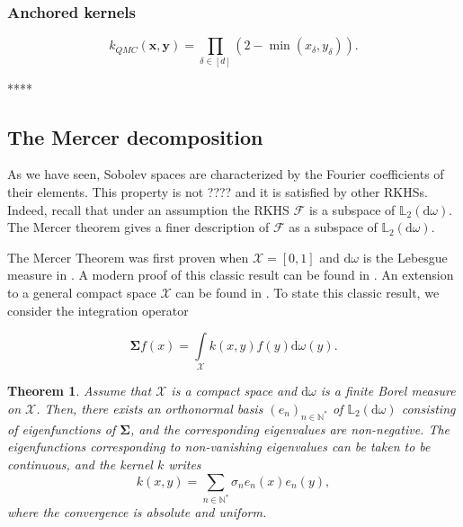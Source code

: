 \documentclass[twoside,11pt]{book}
\newtheorem{theorem}{Theorem}
\numberwithin{theorem}{chapter}
\numberwithin{definition}{chapter}
\numberwithin{proposition}{chapter}
\numberwithin{corollary}{chapter}
\numberwithin{example}{chapter}
\numberwithin{lemma}{chapter}
\begin{document}
\subsubsection{Anchored kernels}

\begin{equation}
k_{QMC}(\bm{x},\bm{y}) = \prod\limits_{\delta \in [d]} (2-\min(x_{\delta},y_{\delta})).
\end{equation}

****


\subsection{The Mercer decomposition}
\label{subsec:mercer}
As we have seen, Sobolev spaces are characterized by the Fourier coefficients of their elements. This property is not ???? and it is satisfied by other RKHSs. Indeed, recall that under an assumption the RKHS $\mathcal{F}$ is a subspace of $\mathbb{L}_{2}(\mathrm{d}\omega)$. The Mercer theorem gives a finer description of $\mathcal{F}$ as a subspace of $\mathbb{L}_{2}(\mathrm{d}\omega)$.



The Mercer Theorem was first proven when $\mathcal{X} = [0,1]$ and $\mathrm{d}\omega$ is the Lebesgue measure in \cite{Mer1909}.
A modern proof of this classic result can be found in \cite{Lax02}. An extension to a general compact space $\mathcal{X}$ can be  found in \cite{CuZh07}. To state this classic result, we consider the integration operator

\begin{equation}
\bm{\Sigma} f(x) = \int\limits_{\mathcal{X}} k(x,y)f(y) \mathrm{d}\omega(y).
\end{equation}
\begin{theorem}\label{thm:Mercer_for_compact}
Assume that $\mathcal{X}$ is a compact space and $\mathrm{d}\omega$ is a finite Borel measure on $\mathcal{X}$.
Then, there exists an orthonormal basis $(e_{n})_{n \in \mathbb{N}^{*}}$ of $\mathbb{L}_{2}(\mathrm{d}\omega)$ consisting of eigenfunctions of $\bm{\Sigma}$, and the corresponding eigenvalues are non-negative.
The eigenfunctions corresponding to non-vanishing eigenvalues can be taken to be continuous, and the kernel $k$ writes
\begin{equation}
k(x,y) = \sum\limits_{n \in \mathbb{N}^{*}} \sigma_{n} e_{n}(x)e_{n}(y),
\end{equation}
where the convergence is absolute and uniform.
\end{theorem}
\end{document}
